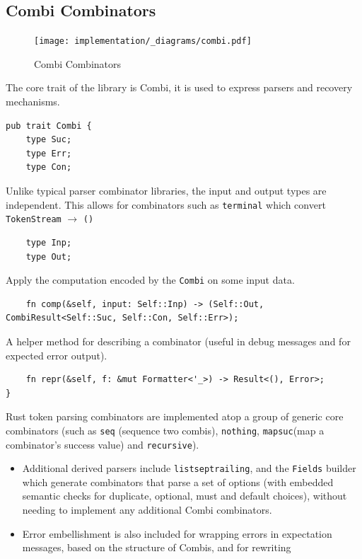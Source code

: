\subsection{Combi Combinators}
\begin{figure}[h!]
    \centering
    \texttt{[image: implementation/\_diagrams/combi.pdf]}
    \caption{Combi Combinators}
\end{figure}
\noindent
The core trait of the library is Combi, it is used to express parsers and recovery mechanisms.
\begin{verbatim}
pub trait Combi {
    type Suc;
    type Err;
    type Con;
\end{verbatim}
Unlike typical parser combinator libraries, the input and output types are independent. This allows for combinators such as \texttt{terminal} which convert \texttt{TokenStream} $\to$ \texttt{()}
\begin{verbatim}
    type Inp;
    type Out;
\end{verbatim}
Apply the computation encoded by the \texttt{Combi} on some input data.
\begin{verbatim}
    fn comp(&self, input: Self::Inp) -> (Self::Out, CombiResult<Self::Suc, Self::Con, Self::Err>);
\end{verbatim}
A helper method for describing a combinator (useful in debug messages and for expected error output).
\begin{verbatim}
    fn repr(&self, f: &mut Formatter<'_>) -> Result<(), Error>;
}
\end{verbatim}
Rust token parsing combinators are implemented atop a group of generic core combinators (such as \texttt{seq} (sequence two combis), \texttt{nothing}, \texttt{mapsuc}(map a combinator's success value) and \texttt{recursive}).
\begin{itemize}
    \setlength\itemsep{0em}
    \item Additional derived parsers include \texttt{listseptrailing}, and the \texttt{Fields} builder which generate combinators that parse a set of options (with embedded semantic checks for duplicate, optional, must and default choices), without needing to implement any additional Combi combinators.
    \item Error embellishment is also included for wrapping errors in expectation messages, based on the structure of Combis, and for rewriting
\end{itemize}
